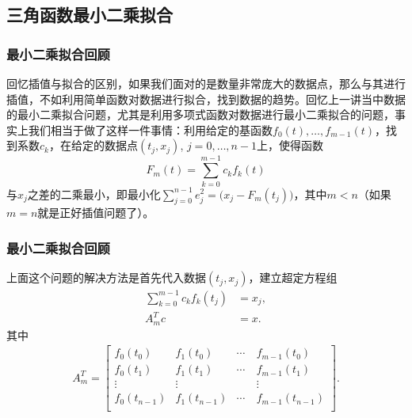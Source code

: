 \documentclass[10pt]{beamer}
\begin{document}
\subsection{三角函数最小二乘拟合}

\begin{frame}
\frametitle{最小二乘拟合回顾}
回忆插值与拟合的区别，如果我们面对的是数量非常庞大的数据点，那么与其进行插值，不如利用简单函数对数据进行拟合，找到数据的趋势。回忆上一讲当中数据的最小二乘拟合问题，尤其是利用多项式函数对数据进行最小二乘拟合的问题，事实上我们相当于做了这样一件事情：利用给定的基函数$f_0(t), \ldots, f_{m-1}(t)$，找到系数$c_k$，在给定的数据点$(t_j, x_j)$, $j = 0, \ldots, n-1$上，使得函数
\begin{equation}
F_m(t) = \sum_{k = 0}^{m-1}c_k f_k(t)
\end{equation}
与$x_j$之差的二乘最小，即最小化$\sum_{j = 0}^{n-1} e_j^2 = \big(x_j - F_m(t_j)\big)$，其中$m < n$（如果$m = n$就是正好插值问题了）。
\end{frame}



\begin{frame}
\frametitle{最小二乘拟合回顾}
上面这个问题的解决方法是首先代入数据$(t_j, x_j)$，建立超定方程组
\begin{align}
\sum_{k = 0}^{m-1} c_k f_k(t_j) &= x_j, \nonumber \\
A_m^T c &= x.
\end{align}
其中
\begin{align}
A_m^T = \left[ \begin{array}{cccc}
     f_0(t_0)    & f_1(t_0) & \cdots  &   f_{m-1}(t_0) \\
      f_0(t_1)   & f_1(t_1) & \cdots  &   f_{m-1}(t_1)  \\
     \vdots       & \vdots   &  \quad  & \vdots  \\
    f_0(t_{n-1})    & f_1(t_{n-1})& \cdots  & f_{m-1}(t_{n-1})  \\                
            \end{array} \right] .
\end{align}
\end{frame}
\end{document}
